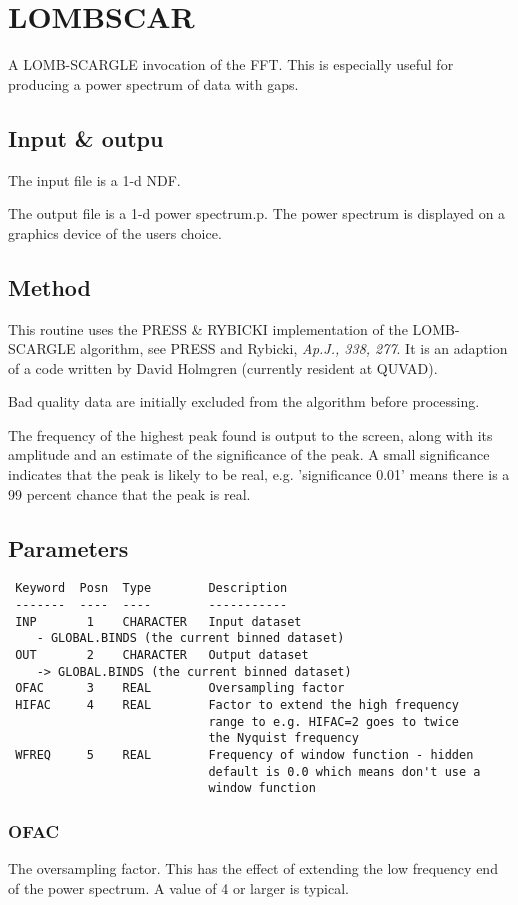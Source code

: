 \documentclass{book}
\renewcommand{\_}{{\tt\char'137}}     %
\begin{document}
\section{LOMBSCAR}
A LOMB-SCARGLE invocation of the FFT. This is especially useful
for producing a power spectrum of data with gaps.

\subsection{Input \& outpu}
The input file is a 1-d NDF.

The output file is a 1-d power spectrum.p.
The power spectrum is displayed on a graphics device of the users
choice.

\subsection{Method}
This routine uses the PRESS \& RYBICKI implementation of the
LOMB-SCARGLE algorithm, see PRESS and Rybicki, {\em Ap.J., 338, 277}.
It is an adaption of a code written by David Holmgren
(currently resident at QUVAD).

Bad quality data are initially excluded from the algorithm
before processing.

The frequency of the highest peak found is output to the screen,
along with its amplitude and an estimate of the significance of
the peak. A small significance indicates that the peak is likely
to be real, e.g. 'significance 0.01' means there is a 99 percent
chance that the peak is real.

\subsection{Parameters}
\begin{verbatim}
 Keyword  Posn  Type        Description
 -------  ----  ----        -----------
 INP       1    CHARACTER   Input dataset
    - GLOBAL.BINDS (the current binned dataset)
 OUT       2    CHARACTER   Output dataset
    -> GLOBAL.BINDS (the current binned dataset)
 OFAC      3    REAL        Oversampling factor
 HIFAC     4    REAL        Factor to extend the high frequency
                            range to e.g. HIFAC=2 goes to twice
                            the Nyquist frequency
 WFREQ     5    REAL        Frequency of window function - hidden
                            default is 0.0 which means don't use a
                            window function

\end{verbatim}\subsubsection{OFAC}
The oversampling factor. This has the effect of extending the low
frequency end of the power spectrum. A value of 4 or larger is
typical.
\end{document}

